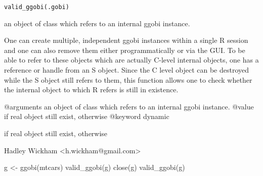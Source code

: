 \documentclass{article}
\begin{document}
\begin{Description}\relax
\end{Description}
\begin{Usage}
\begin{verbatim}valid_ggobi(.gobi)\end{verbatim}
\end{Usage}
\begin{Arguments}
\begin{ldescription}
\item[\code{.gobi}] an object of class  which refers to an internal ggobi instance.
\end{ldescription}
\end{Arguments}
\begin{Details}\relax
One can create multiple, independent ggobi instances within a single
R session and one can also remove them either programmatically or
via the GUI.  To be able to refer to these objects which are
actually C-level internal objects, one has a reference or handle
from an S object. Since the C level object can be destroyed while the S
object still refers to them, this function allows one to check whether the
internal object to which R refers is still in existence.

@arguments an object of class  which refers to an internal ggobi instance.
@value  if real object still exist,  otherwise
@keyword dynamic
\end{Details}
\begin{Value}
 if real object still exist,  otherwise
\end{Value}
\begin{Author}\relax
Hadley Wickham <h.wickham@gmail.com>
\end{Author}
\begin{Examples}
\begin{ExampleCode}g <- ggobi(mtcars)
valid_ggobi(g)
close(g)
valid_ggobi(g) \end{ExampleCode}
\end{Examples}
\end{document}
